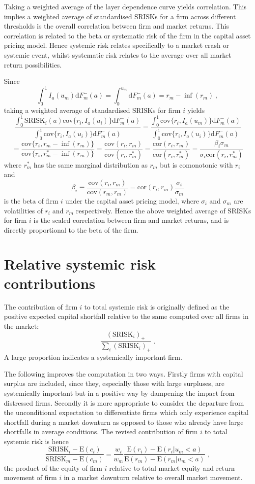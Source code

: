 \documentclass[authoryear]{elsarticle}
\newcommand{\E}{\mathrm{E}}
\newcommand{\cov}{\mathrm{cov}}
\newcommand{\cor}{\mathrm{cor}}
\newcommand{\de}{\mathrm{d}}
\begin{document}
Taking a weighted average of the layer dependence curve yields correlation. This implies a weighted average of standardised SRISKs for a firm across different thresholds is the overall correlation between firm and market returns. This correlation is related to the beta or systematic risk of the firm in the capital asset pricing model. Hence systemic risk relates specifically to a market crash or systemic event, whilst systematic risk relates to the average over all market return possibilities.

Since 
$$
\int_0^1 I_a(u_m) \de F^-_m(a)  = \int_0^{u_m} \de F^-_m(a) = r_m-\inf(r_m) \;,
$$
taking a weighted average of standardised SRISKs for firm $i$ yields
$$
\frac{\int_0^1 \mathrm{SRISK}_i(a) \cov\{r_i,I_a(u_i)\} \de F^-_m(a) }
{\int_0^1\cov\{r_i,I_a(u_i)\} \de F^-_m(a) }
=\frac{\int_0^1 \cov\{r_i,I_a(u_m)\} \de F^-_m(a) }
{\int_0^1\cov\{r_i,I_a(u_i)\} \de F^-_m(a) }
$$
$$
=\frac{\cov\{r_i,r_m-\inf(r_m)\}}{\cov\{r_i, r_m^*-\inf(r_m)\}}
=\frac{\cov(r_i, r_m)}{\cov(r_i, r_m^*)}
=\frac{\cor(r_i, r_m)}{\cor(r_i, r_m^*)} = \frac{\beta_i\sigma_m }{\sigma_i\cor(r_i, r_m^*)}
$$
where $r_m^*$ has the same marginal distribution as $r_m$ but is comonotonic with $r_i$ and
$$
\beta_i \equiv \frac{\cov(r_i,r_m)}{\cov(r_m,r_m)} = \cor(r_i,r_m)\frac{\sigma_i}{\sigma_m} 
$$
is the beta of firm $i$ under the capital asset pricing model, where $\sigma_i$ and $\sigma_m$ are volatilities of $r_i$ and $r_m$ respectively. Hence the above weighted average of SRISKs for firm $i$ is the scaled correlation between firm and market returns, and is directly proportional to the beta of the firm.





\section{Relative systemic risk contributions}

The contribution of firm $i$ to total systemic risk is originally defined as the positive expected capital shortfall relative to the same computed over all firms in the market:
$$
\frac{ (\mathrm{SRISK}_i)_+}{\sum_i(\mathrm{SRISK}_i)_+}  \;.
$$
A large proportion indicates a systemically important firm. 

The following improves the computation in two ways. Firstly firms with capital surplus are included, since they, especially those with large surpluses, are systemically important but in a positive way by dampening the impact from distressed firms. Secondly it is more appropriate to consider the departure from the unconditional expectation to differentiate firms which only experience capital shortfall during a market downturn as opposed to those who already have large shortfalls in average conditions. The revised contribution of firm $i$ to total systemic risk is hence
$$
\frac{\mathrm{SRISK}_i-\E(c_i)}{\mathrm{SRISK}_m-\E(c_m)}
=\frac{w_i }{w_m } \frac{\E(r_i)-\E(r_i|u_m<a)}{\E(r_m)-\E(r_m|u_m<a)} \;,
$$
the product of the equity of firm $i$ relative to total market equity and return movement of firm $i$ in a market downturn relative to overall market movement.
\end{document}
